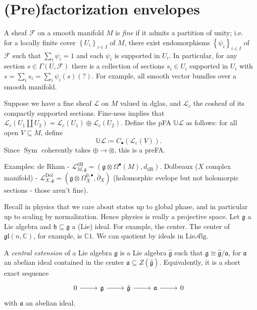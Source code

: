 \section{(Pre)factorization envelopes}

A sheaf $\mathcal{F} $ on a smooth manifold $M$ is \emph{fine} if it admits a partition of unity; i.e. for a locally finite cover $\left\{ U_i \right\} _{i\in I} $ of $M$, there exist endomorphisms $\left\{ \psi _i \right\} _{i\in I} $ of $\mathcal{F} $ such that $\sum_{i} \psi _i=1$ and each $\psi _i$ is supported in $U_i$. In particular, for any section $s\in \Gamma (U,\mathcal{F})$ there is a collection of sections $s_i\in U_i$ supported in $U_i$ with $s=\sum_{i} s_i = \sum_{i} \psi _i(s)(?)$. For example, all smooth vector bundles over a smooth manifold.

Suppose we have a fine sheaf $\mathcal{L} $ on $M$ valued in dglas, and $\mathcal{L} _c$ the cosheaf of its compactly supported sections. Fine-ness implies that $\mathcal{L} _c(U_1 \amalg U_2) = \mathcal{L} _c(U_1)\oplus \mathcal{L} _c(U_2)$. Define the pFA $\mathbb{U} \mathcal{L} $ as follows: for all open $V\subseteq M$, define
\[
	\mathbb{U} \mathcal{L} \coloneqq C_{\bullet} (\mathcal{L} _c(V))
.\]
Since $\operatorname{Sym}$ coherently takes $\oplus \to \otimes $, this is a preFA.

Examples: de Rham - $\mathcal{L} ^{\mathrm{dR} }_{M,\mathfrak{g} } =(\mathfrak{g} \otimes \Omega ^{\bullet} (M),d_{\mathrm{dR} } )$. Dolbeaux ($X$ complex manifold) - $\mathcal{L} _{X,\mathfrak{g} } ^{\mathrm{Dol} } =(\mathfrak{g} \otimes \Omega _X^{0,\bullet} ,\overline{\partial } _X)$ (holomorphic evelope but not holomorpic sections - those aren't fine).

Recall in physics that we care about states up to global phase, and in particular up to scaling by normalization. Hence physics is really a projective space. Let $\mathfrak{g} $ a Lie algebra and $\mathfrak{h}\subseteq \mathfrak{g} $ a (Lie) ideal. For example, the center. The center of $\mathfrak{gl} (n,\mathbb{C} )$, for example, is $\mathbb{C} 1$. We can quotient by ideals in $\mathrm{L} \mathrm{ie} \mathcal{A} \mathrm{lg} $.

A \emph{central extension} of a Lie algebra $\mathfrak{g} $ is a Lie algebra $\hat{\mathfrak{g} }$ such that $\mathfrak{g} \cong \hat{\mathfrak{g} } / \mathfrak{a} $, for $\mathfrak{a} $ an abelian ideal contained in the center $\mathfrak{a} \subseteq Z(\hat{\mathfrak{g}} )$. Equivalently, it is a short exact sequence
\[\begin{tikzcd}[row sep = 2.5em, column sep = 2.5em]
	0\ar[r]  & \mathfrak{g} \ar[r]  & \hat{\mathfrak{g} }\ar[r]  & \mathfrak{a} \ar[r]  & 0
\end{tikzcd}\]
with $\mathfrak{a} $ an abelian ideal.


